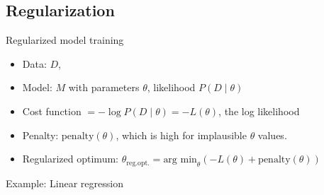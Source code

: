 \subsection{Regularization}
\no Regularized model training
\begin{itemize}
	\item Data: $D$, 
	\item Model: $M$ with parameters $\theta$, likelihood $P(D\;|\;\theta)$
	\item Cost function $= - \log P(D\;|\;\theta) = - L(\theta)$, the log likelihood
	\item Penalty: $\text{penalty}(\theta)$, which is high for implausible $\theta$ values.
	\item Regularized optimum: $\theta_\text{reg.opt.} = \text{arg min}_\theta (-L(\theta) + \text{penalty}(\theta))$
\end{itemize}
Example: Linear regression
